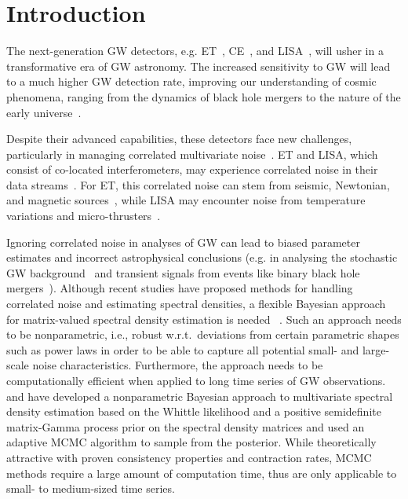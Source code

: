 \documentclass[%
 reprint,
 amsmath,amssymb,
 aps,
 nofootinbib,
]{revtex4-2}
\begin{document}
\section{Introduction}

The next-generation \ac{GW} detectors, e.g. \ac{ET}~\cite{Punturo_2010}, \ac{CE}~\cite{CE_horizon_study}, and \ac{LISA}~\cite{LISA_science_case}, will usher in a transformative era of \ac{GW} astronomy. 
The increased sensitivity to \ac{GW} will lead to a much higher \ac{GW} detection rate, improving our understanding of cosmic phenomena, ranging from the dynamics of black hole mergers to the nature of the early universe~\cite{ET_science_case, Maggiore_2020_ET_science_case, Branchesi_2023_ET_science_case, CE_horizon_study, LISA_science_case}.

Despite their advanced capabilities, these detectors face new challenges, particularly in managing correlated multivariate noise~\cite{ET_design_report,LISA_red_book}.
\ac{ET} and \ac{LISA}, which consist of co-located interferometers, may experience correlated noise in their data streams~\cite{Janssens2023}. 
For \ac{ET}, this correlated noise can stem from seismic, Newtonian, and magnetic sources~\cite{Ball_lightning_strokes, Janssens_newtonian_seismic, Janssens_magnetic_noise}, while \ac{LISA}  may encounter noise from temperature variations and micro-thrusters~\cite{lisa_temp_noise,lisa_thrusters_noise}. 

Ignoring correlated noise in analyses of \ac{GW} can lead to biased parameter estimates and incorrect astrophysical conclusions (e.g. in analysing the stochastic \ac{GW} background~\cite{Thrane_correlations_SGWB, Christensen_2019_SGWB, boileau2022figures} and transient signals from events like binary black hole mergers~\cite{Cireddu:2023:arXiv}). 
Although recent studies have proposed methods for handling correlated noise and estimating spectral densities, a flexible Bayesian approach for matrix-valued spectral density estimation is needed~\cite{Cireddu:2023:arXiv,JanssensKamiel2023Ffps} . 
Such an approach needs to be nonparametric, i.e., robust w.r.t.\ deviations from certain parametric shapes such as power laws in order to be able to capture all potential small- and large-scale noise characteristics.
Furthermore, the approach needs to be computationally efficient when applied to long time series of \ac{GW} observations. 
\citet{MeierAlexander2020Bnao} and \citet{Liu2023} have developed a nonparametric Bayesian approach to multivariate spectral density estimation based on the Whittle likelihood and a positive semidefinite matrix-Gamma process prior on the spectral density matrices and used an adaptive MCMC algorithm to sample from the posterior. 
While theoretically attractive with proven consistency properties and contraction rates, MCMC methods require a large amount of computation time, thus are only applicable to small- to medium-sized time series. 
\end{document}
